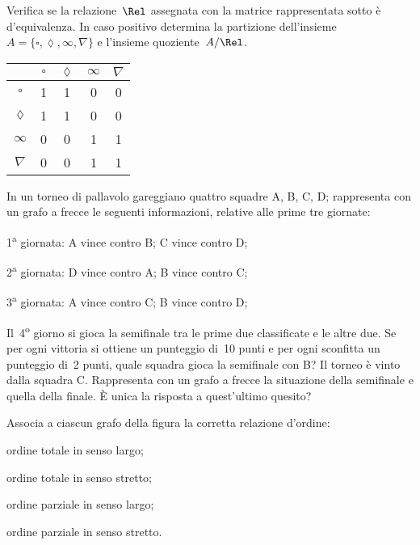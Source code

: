 \begin{esercizio}
\label{ese:\thechapter.48}
Verifica se la relazione~$\Rel$ assegnata con la matrice rappresentata
sotto è d'equivalenza. In caso positivo determina la partizione dell'insieme~$A =\{\square, \lozenge, \infty, \nabla\}$ e l'insieme
quoziente~$A/\Rel$.

\begin{center}
\begin{tabular}{ccccc}
\toprule
 & $\square$ & $\lozenge$ & $\infty$ & $\nabla$\\
\midrule
 $\square$ & 1 & 1 & 0 & 0 \\
 $\lozenge$ & 1 & 1 & 0 & 0 \\
 $\infty$ & 0 & 0 & 1 & 1\\
 $\nabla$ & 0 & 0 & 1 & 1\\
\bottomrule
\end{tabular}
\end{center}
\end{esercizio}

\begin{esercizio}
\label{ese:\thechapter.49}
In un torneo di pallavolo gareggiano quattro squadre A, B, C, D; rappresenta con un grafo a frecce le seguenti informazioni, relative alle prime tre giornate:
\begin{itemize*}
\item 1\textsuperscript{a} giornata: A vince contro B; C vince contro D;
\item 2\textsuperscript{a} giornata: D vince contro A; B vince contro C;
\item 3\textsuperscript{a} giornata: A vince contro C; B vince contro D;
\end{itemize*}
Il~4\textsuperscript{o} giorno si gioca la semifinale tra le prime due classificate e le altre due. Se per ogni vittoria si ottiene un punteggio di~10 punti e per ogni sconfitta un punteggio
di~2 punti, quale squadra gioca la semifinale con B?
Il torneo è vinto dalla squadra C. Rappresenta con un grafo a frecce la situazione della semifinale e quella
della finale. \`E unica la risposta a quest'ultimo quesito?
\end{esercizio}

\begin{esercizio}
\label{ese:\thechapter.50}
Associa a ciascun grafo della figura %
la corretta relazione d'ordine:
\begin{enumeratea}
\item ordine totale in senso largo;
\item ordine totale in senso stretto;
\item ordine parziale in senso largo;
\item ordine parziale in senso stretto.
\end{enumeratea}
\begin{center}
 
\end{center}
\end{esercizio}

